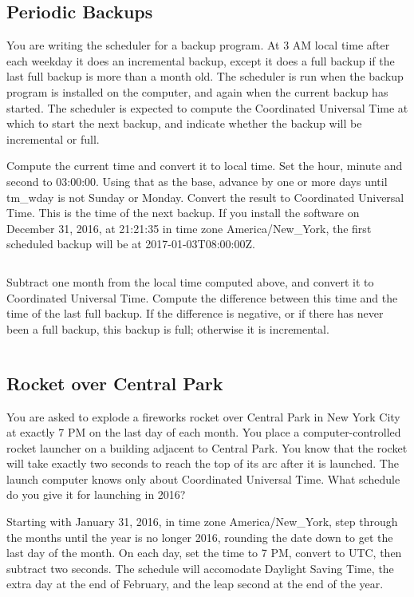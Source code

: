 \documentclass[letterpaper,twoside]{article}
\begin{document}
\subsection{Periodic Backups}
You are writing the scheduler for a backup program.  At 3 AM
local time
after each weekday it does an incremental backup,
except it does a full backup if the last full backup is more
than a month old.  The scheduler is run when the backup program
is installed on the computer, and again when
the current backup has started.  The scheduler is expected
to compute the Coordinated Universal Time at which to start
the next backup, and indicate whether the backup will be
incremental or full.

Compute the current time and convert it to local time.
Set the hour, minute and second to 03:00:00.
Using that as the base, advance by one or more days
until tm\_wday is not Sunday or Monday.  Convert the result
to Coordinated Universal Time.  This is the time of the
next backup.  If you install the software on December 31, 2016,
at 21:21:35 in time zone America/New\_York, the first
scheduled backup will be at 2017-01-03T08:00:00Z.
\inputminted[firstline=44,lastline=76]{c}{example_02.c}

Subtract one month from the local time computed above, and
convert it to Coordinated Universal Time.  Compute the
difference between this time and the time of the last
full backup.  If the difference is negative, or if there
has never been a full backup, this backup is full;
otherwise it is incremental.
\inputminted[firstline=78,lastline=94]{c}{example_02.c}

\subsection{Rocket over Central Park}
You are asked to explode a fireworks rocket over Central
Park in New York City at exactly 7 PM on the last day of each month.
You place a computer-controlled
rocket launcher on a building adjacent to Central Park.  You know that
the rocket will take exactly two seconds to reach the top of its
arc after it is launched.  The launch computer knows only about Coordinated
Universal Time.  What schedule do you give it for launching in 2016?

Starting with January 31, 2016, in time zone America/New\_York,
step through the months until the year is no longer 2016, rounding
the date down to get the last day of the month.
On each day, set the time to 7 PM, convert to UTC, then subtract
two seconds.  The schedule will accomodate Daylight Saving Time,
the extra day at the end of February,
and the leap second at the end of the year.
\inputminted[firstline=45,lastline=81]{c}{example_03.c}
\end{document}
